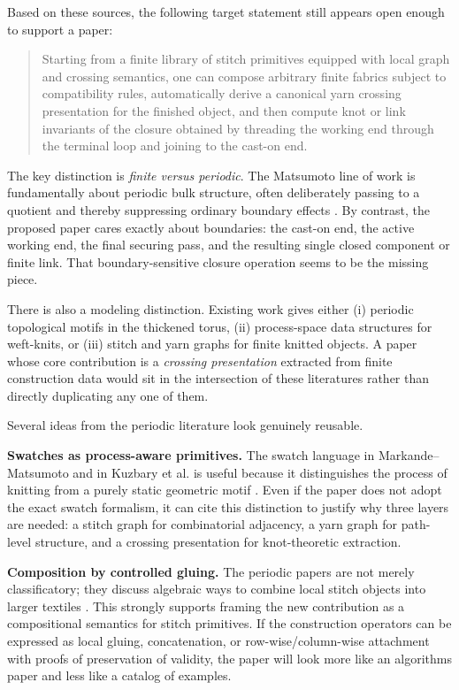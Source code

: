 \documentclass[11pt]{article}
\newcommand{\memoheader}[1]{\vspace{0.4em}{\large\bfseries\color{heading} #1}\par\vspace{0.2em}}
\begin{document}
\memoheader{What seems not yet proved}
Based on these sources, the following target statement still appears open enough to support a paper:
\begin{quote}
Starting from a finite library of stitch primitives equipped with local graph and crossing semantics, one can compose arbitrary finite fabrics subject to compatibility rules, automatically derive a canonical yarn crossing presentation for the finished object, and then compute knot or link invariants of the closure obtained by threading the working end through the terminal loop and joining to the cast-on end.
\end{quote}
The key distinction is \emph{finite versus periodic}. The Matsumoto line of work is fundamentally about periodic bulk structure, often deliberately passing to a quotient and thereby suppressing ordinary boundary effects \citep{MarkandeMatsumoto2020,KuzbaryEtAl2025}. By contrast, the proposed paper cares exactly about boundaries: the cast-on end, the active working end, the final securing pass, and the resulting single closed component or finite link. That boundary-sensitive closure operation seems to be the missing piece.

There is also a modeling distinction. Existing work gives either (i) periodic topological motifs in the thickened torus, (ii) process-space data structures for weft-knits, or (iii) stitch and yarn graphs for finite knitted objects. A paper whose core contribution is a \emph{crossing presentation} extracted from finite construction data would sit in the intersection of these literatures rather than directly duplicating any one of them.

\memoheader{Methods and ideas worth borrowing}
Several ideas from the periodic literature look genuinely reusable.

\textbf{Swatches as process-aware primitives.} The swatch language in Markande--Matsumoto and in Kuzbary et al. is useful because it distinguishes the process of knitting from a purely static geometric motif \citep{MarkandeMatsumoto2020,KuzbaryEtAl2025}. Even if the paper does not adopt the exact swatch formalism, it can cite this distinction to justify why three layers are needed: a stitch graph for combinatorial adjacency, a yarn graph for path-level structure, and a crossing presentation for knot-theoretic extraction.

\textbf{Composition by controlled gluing.} The periodic papers are not merely classificatory; they discuss algebraic ways to combine local stitch objects into larger textiles \citep{MarkandeMatsumoto2020,KuzbaryEtAl2025}. This strongly supports framing the new contribution as a compositional semantics for stitch primitives. If the construction operators can be expressed as local gluing, concatenation, or row-wise/column-wise attachment with proofs of preservation of validity, the paper will look more like an algorithms paper and less like a catalog of examples.
\end{document}
